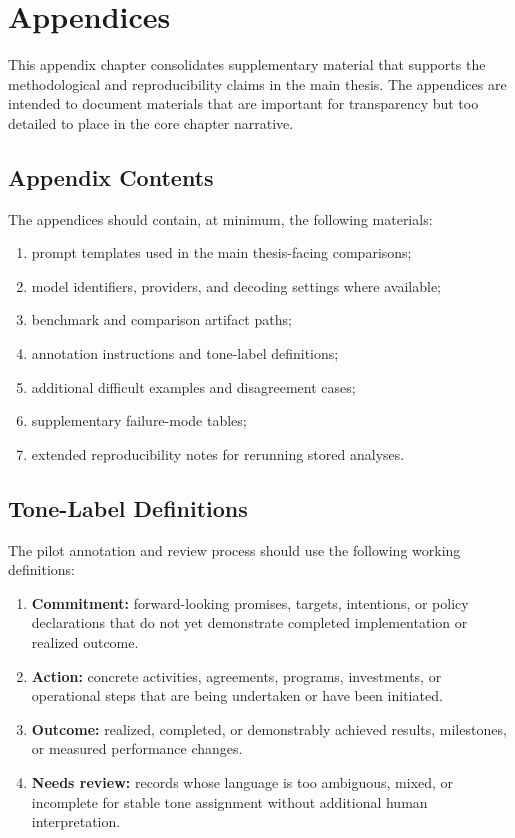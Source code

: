 \chapter{Appendices}\label{appendices}

This appendix chapter consolidates supplementary material that supports the methodological and reproducibility claims in the main thesis. The appendices are intended to document materials that are important for transparency but too detailed to place in the core chapter narrative.

\section{Appendix Contents}\label{appendix-contents}

The appendices should contain, at minimum, the following materials:

\begin{enumerate}
\def\labelenumi{\arabic{enumi}.}
\tightlist
\item
  prompt templates used in the main thesis-facing comparisons;
\item
  model identifiers, providers, and decoding settings where available;
\item
  benchmark and comparison artifact paths;
\item
  annotation instructions and tone-label definitions;
\item
  additional difficult examples and disagreement cases;
\item
  supplementary failure-mode tables;
\item
  extended reproducibility notes for rerunning stored analyses.
\end{enumerate}

\section{Tone-Label Definitions}\label{tone-label-definitions}

The pilot annotation and review process should use the following working definitions:

\begin{enumerate}
\def\labelenumi{\arabic{enumi}.}
\tightlist
\item
  \textbf{Commitment:} forward-looking promises, targets, intentions, or policy declarations that do not yet demonstrate completed implementation or realized outcome.
\item
  \textbf{Action:} concrete activities, agreements, programs, investments, or operational steps that are being undertaken or have been initiated.
\item
  \textbf{Outcome:} realized, completed, or demonstrably achieved results, milestones, or measured performance changes.
\item
  \textbf{Needs review:} records whose language is too ambiguous, mixed, or incomplete for stable tone assignment without additional human interpretation.
\end{enumerate}

